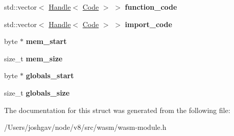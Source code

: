 \begin{DoxyCompactItemize}
\item 
std\+::vector$<$ \hyperlink{classv8_1_1internal_1_1_handle}{Handle}$<$ \hyperlink{classv8_1_1internal_1_1_code}{Code} $>$ $>$ {\bfseries function\+\_\+code}\hypertarget{structv8_1_1internal_1_1wasm_1_1_wasm_module_instance_a23965953d057506902e52e80eed98cb0}{}\label{structv8_1_1internal_1_1wasm_1_1_wasm_module_instance_a23965953d057506902e52e80eed98cb0}

\item 
std\+::vector$<$ \hyperlink{classv8_1_1internal_1_1_handle}{Handle}$<$ \hyperlink{classv8_1_1internal_1_1_code}{Code} $>$ $>$ {\bfseries import\+\_\+code}\hypertarget{structv8_1_1internal_1_1wasm_1_1_wasm_module_instance_ab467b3e3e34cd278c2b424cd56b9199d}{}\label{structv8_1_1internal_1_1wasm_1_1_wasm_module_instance_ab467b3e3e34cd278c2b424cd56b9199d}

\item 
byte $\ast$ {\bfseries mem\+\_\+start}\hypertarget{structv8_1_1internal_1_1wasm_1_1_wasm_module_instance_aa614f87e4da9bfc72f8e63ef57cf95e3}{}\label{structv8_1_1internal_1_1wasm_1_1_wasm_module_instance_aa614f87e4da9bfc72f8e63ef57cf95e3}

\item 
size\+\_\+t {\bfseries mem\+\_\+size}\hypertarget{structv8_1_1internal_1_1wasm_1_1_wasm_module_instance_adf889d3da43a06d255280331354be54c}{}\label{structv8_1_1internal_1_1wasm_1_1_wasm_module_instance_adf889d3da43a06d255280331354be54c}

\item 
byte $\ast$ {\bfseries globals\+\_\+start}\hypertarget{structv8_1_1internal_1_1wasm_1_1_wasm_module_instance_a7324dcef1293ce6657786d41328dba1f}{}\label{structv8_1_1internal_1_1wasm_1_1_wasm_module_instance_a7324dcef1293ce6657786d41328dba1f}

\item 
size\+\_\+t {\bfseries globals\+\_\+size}\hypertarget{structv8_1_1internal_1_1wasm_1_1_wasm_module_instance_a3bd928e4df55923effe666e984d38363}{}\label{structv8_1_1internal_1_1wasm_1_1_wasm_module_instance_a3bd928e4df55923effe666e984d38363}

\end{DoxyCompactItemize}


The documentation for this struct was generated from the following file\+:\begin{DoxyCompactItemize}
\item 
/\+Users/joshgav/node/v8/src/wasm/wasm-\/module.\+h\end{DoxyCompactItemize}
